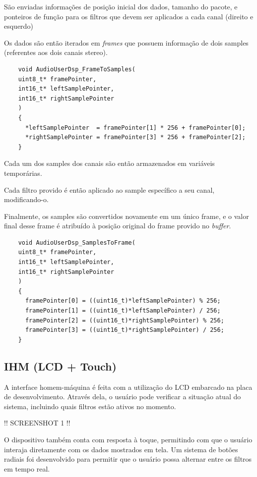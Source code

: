 São enviadas informações de posição inicial dos dados, tamanho do pacote, e ponteiros de função para os filtros que devem ser aplicados a cada canal (direito e esquerdo)

Os dados são então iterados em \textit{frames} que possuem informação de dois samples (referentes aos dois canais stereo).

\begin{verbatim}
    void AudioUserDsp_FrameToSamples(
    uint8_t* framePointer, 
    int16_t* leftSamplePointer, 
    int16_t* rightSamplePointer
    )
    {
      *leftSamplePointer  = framePointer[1] * 256 + framePointer[0];
      *rightSamplePointer = framePointer[3] * 256 + framePointer[2];
    }
\end{verbatim}

Cada um dos samples dos canais são então armazenados em variáveis temporárias. 

Cada filtro provido é então aplicado ao sample específico a seu canal, modificando-o. 

Finalmente, os samples são convertidos novamente em um único frame, e o valor final desse frame é atribuído à posição original do frame provido no \textit{buffer}.

\begin{verbatim}
    void AudioUserDsp_SamplesToFrame(
    uint8_t* framePointer, 
    int16_t* leftSamplePointer, 
    int16_t* rightSamplePointer
    )
    {
      framePointer[0] = ((uint16_t)*leftSamplePointer) % 256;
      framePointer[1] = ((uint16_t)*leftSamplePointer) / 256;
      framePointer[2] = ((uint16_t)*rightSamplePointer) % 256;
      framePointer[3] = ((uint16_t)*rightSamplePointer) / 256;
    }
\end{verbatim}


\subsection{IHM (LCD + Touch)}
A interface homem-máquina é feita com a utilização do LCD embarcado na placa de desenvolvimento. Através dela, o usuário pode verificar a situação atual do sistema, incluindo quais filtros estão ativos no momento.

!! SCREENSHOT 1 !!

O dispositivo também conta com resposta à toque, permitindo com que o usuário interaja diretamente com os dados mostrados em tela. Um sistema de botões radiais foi desenvolvido para permitir que o usuário possa alternar entre os filtros em tempo real.


